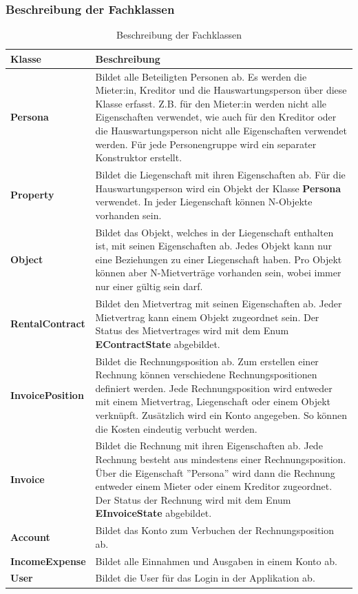 \subsubsection{Beschreibung der Fachklassen}
\begin{table}[H]
  \centering
  \settowidth{}
  \setlength\extrarowheight{2pt}
    \begin{tabulary}{1.0\textwidth}{|L|L|}
      \hline
      \textbf{Klasse}& \textbf{Beschreibung}\\
    \hline
    \textbf{Persona} & Bildet alle Beteiligten Personen ab. Es werden die Mieter:in, Kreditor und die Hauswartungsperson über diese Klasse erfasst. Z.B. für den Mieter:in werden nicht alle Eigenschaften verwendet, wie auch für den Kreditor oder die Hauswartungsperson nicht alle Eigenschaften verwendet werden. Für jede Personengruppe wird ein separater Konstruktor erstellt.\\
    \hline
    \textbf{Property} & Bildet die Liegenschaft mit ihren Eigenschaften ab. Für die Hauswartungsperson wird ein Objekt der Klasse \textbf{Persona} verwendet. In jeder Liegenschaft können N-Objekte vorhanden sein.\\
    \hline
    \textbf{Object} & Bildet das Objekt, welches in der Liegenschaft enthalten ist, mit seinen Eigenschaften ab. Jedes Objekt kann nur eine Beziehungen zu einer Liegenschaft haben. Pro Objekt können aber N-Mietverträge vorhanden sein, wobei immer nur einer gültig sein darf. \\
    \hline
    \textbf{RentalContract} & Bildet den Mietvertrag mit seinen Eigenschaften ab. Jeder Mietvertrag kann einem Objekt zugeordnet sein. Der Status des Mietvertrages wird mit dem Enum \textbf{EContractState} abgebildet.\\
    \hline
    \textbf{InvoicePosition} & Bildet die Rechnungsposition ab. Zum erstellen einer Rechnung können verschiedene Rechnungspositionen definiert werden. Jede Rechnungsposition wird entweder mit einem Mietvertrag, Liegenschaft oder einem Objekt verknüpft. Zusätzlich wird ein Konto angegeben. So können die Kosten eindeutig verbucht werden.\\
    \hline
    \textbf{Invoice} & Bildet die Rechnung mit ihren Eigenschaften ab. Jede Rechnung besteht aus mindestens einer Rechnungsposition. Über die Eigenschaft ''Persona'' wird dann die Rechnung entweder einem Mieter oder einem Kreditor zugeordnet. Der Status der Rechnung wird mit dem Enum \textbf{EInvoiceState} abgebildet.\\
    \hline
    \textbf{Account} & Bildet das Konto zum Verbuchen der Rechnungsposition ab.\\
    \hline 
    \textbf{IncomeExpense} & Bildet alle Einnahmen und Ausgaben in einem Konto ab.\\
    \hline
    \textbf{User} & Bildet die User für das Login in der Applikation ab.\\
    \hline
\end{tabulary}
\caption{Beschreibung der Fachklassen}
\end{table}

